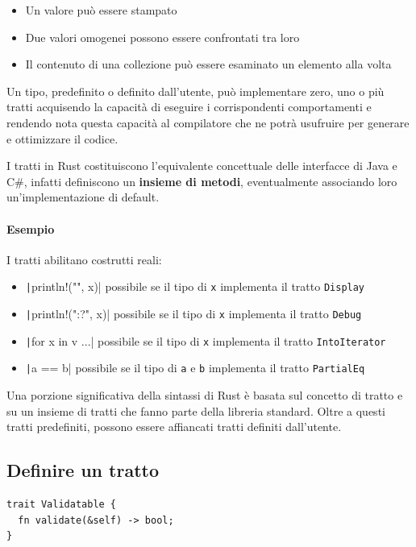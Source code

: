 \begin{itemize}
  \item Un valore può essere stampato
  \item Due valori omogenei possono essere confrontati tra loro
  \item Il contenuto di una collezione può essere esaminato un elemento alla volta
\end{itemize}

Un tipo, predefinito o definito dall'utente, può implementare zero, uno o più
tratti acquisendo la capacità di eseguire i corrispondenti comportamenti e
rendendo nota questa capacità al compilatore che ne potrà usufruire per generare
e ottimizzare il codice.

I tratti in Rust costituiscono l'equivalente concettuale delle interfacce di
Java e C\#, infatti definiscono un \textbf{insieme di metodi}, eventualmente associando loro un’implementazione di
default.

\paragraph{Esempio}
I tratti abilitano costrutti reali:
\begin{itemize}
  \item \texttt|println!("{}", x)| possibile se il tipo di \texttt{x} implementa il tratto \texttt{Display}
  \item \texttt|println!("{:?}", x)| possibile se il tipo di \texttt{x} implementa il tratto \texttt{Debug}
  \item \texttt|for x in v {...}| possibile se il tipo di \texttt{x} implementa il tratto \texttt{IntoIterator}
  \item \texttt|a == b| possibile se il tipo di \texttt{a} e \texttt{b} implementa il tratto \texttt{PartialEq}
\end{itemize}

Una porzione significativa della sintassi di Rust è basata sul concetto di
tratto e su un insieme di tratti che fanno parte della libreria standard.
Oltre a questi tratti predefiniti, possono essere affiancati tratti definiti dall'utente.


\subsection{Definire un tratto}


\begin{verbatim}
trait Validatable {
  fn validate(&self) -> bool;
}  
\end{verbatim}

